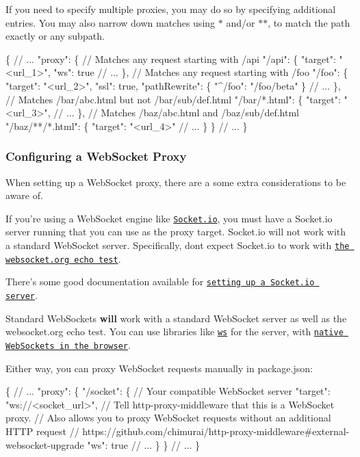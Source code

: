 If you need to specify multiple proxies, you may do so by specifying additional entries. You may also narrow down matches using {\ttfamily $\ast$} and/or {\ttfamily $\ast$$\ast$}, to match the path exactly or any subpath. 
\begin{DoxyCode}
\{
  // ...
  "proxy": \{
    // Matches any request starting with /api
    "/api": \{
      "target": "<url\_1>",
      "ws": true
      // ...
    \},
    // Matches any request starting with /foo
    "/foo": \{
      "target": "<url\_2>",
      "ssl": true,
      "pathRewrite": \{
        "^/foo": "/foo/beta"
      \}
      // ...
    \},
    // Matches /bar/abc.html but not /bar/sub/def.html
    "/bar/*.html": \{
      "target": "<url\_3>",
      // ...
    \},
    // Matches /baz/abc.html and /baz/sub/def.html
    "/baz/**/*.html": \{
      "target": "<url\_4>"
      // ...
    \}
  \}
  // ...
\}
\end{DoxyCode}


\subsubsection*{Configuring a Web\+Socket Proxy}

When setting up a Web\+Socket proxy, there are a some extra considerations to be aware of.

If you’re using a Web\+Socket engine like \href{https://socket.io/}{\tt Socket.\+io}, you must have a Socket.\+io server running that you can use as the proxy target. Socket.\+io will not work with a standard Web\+Socket server. Specifically, don\textquotesingle{}t expect Socket.\+io to work with \href{http://websocket.org/echo.html}{\tt the websocket.\+org echo test}.

There’s some good documentation available for \href{https://socket.io/docs/}{\tt setting up a Socket.\+io server}.

Standard Web\+Sockets {\bfseries will} work with a standard Web\+Socket server as well as the websocket.\+org echo test. You can use libraries like \href{https://github.com/websockets/ws}{\tt ws} for the server, with \href{https://developer.mozilla.org/en-US/docs/Web/API/WebSocket}{\tt native Web\+Sockets in the browser}.

Either way, you can proxy Web\+Socket requests manually in {\ttfamily package.\+json}\+:


\begin{DoxyCode}
\{
  // ...
  "proxy": \{
    "/socket": \{
      // Your compatible WebSocket server
      "target": "ws://<socket\_url>",
      // Tell http-proxy-middleware that this is a WebSocket proxy.
      // Also allows you to proxy WebSocket requests without an additional HTTP request
      // https://github.com/chimurai/http-proxy-middleware#external-websocket-upgrade
      "ws": true
      // ...
    \}
  \}
  // ...
\}
\end{DoxyCode}


